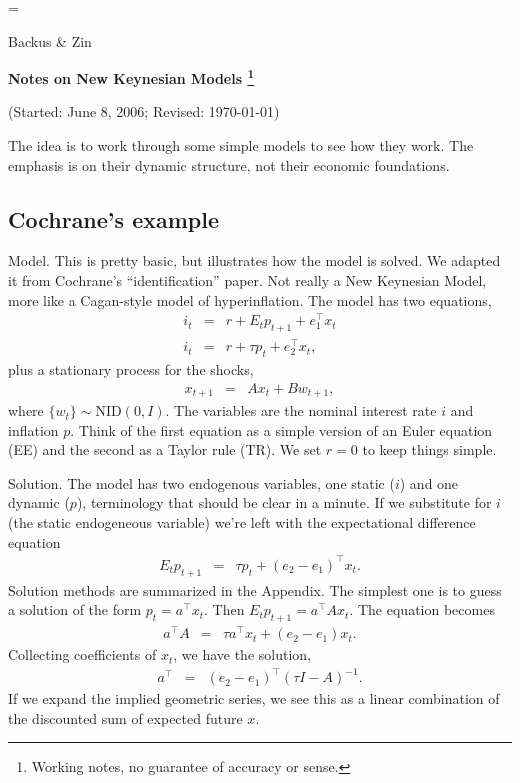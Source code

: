 \documentclass[11pt]{article}
\begin{document}
\parskip=\bigskipamount
\parindent=0.0in
\thispagestyle{empty}
\begin{flushright} Backus \& Zin \end{flushright}

\bigskip
\centerline{\Large \bf Notes on New Keynesian Models%
\footnote{Working notes, no guarantee of accuracy or sense.}}
\centerline{(Started: June 8, 2006; Revised: \today)}

\bigskip
The idea is to work through some simple models to 
see how they work.  
The emphasis is on their dynamic structure, 
not their economic foundations.   

\subsection*{Cochrane's example} 

Model.  
This is pretty basic, but illustrates how the model is solved.  
We adapted it from Cochrane's ``identification'' paper.  
Not really a New Keynesian Model, 
more like a Cagan-style model of hyperinflation.
The model has two equations, 
\begin{eqnarray*}
    i_t &=& r + E_t p_{t+1} + e_1^\top x_{t} \\
    i_t &=& r + \tau p_t + e_2^\top x_t ,
\end{eqnarray*}
plus a stationary process for the shocks, 
\begin{eqnarray*}
    x_{t+1} &=& A x_t + B w_{t+1} ,
\end{eqnarray*} 
where $\{ w_t \} \sim \mbox{NID}(0,I)$.
The variables are the nominal interest rate $i$ and inflation $p$.
Think of the first equation as a simple version of an Euler equation (EE) 
and the second as a Taylor rule (TR).
We set $r=0$ to keep things simple.    

Solution.  
The model has two endogenous variables, one static ($i$)
and one dynamic ($p$), terminology that should be clear in a minute.
If we substitute for $i$ (the static endogeneous variable)  
we're left with the expectational difference equation
\begin{eqnarray*}
    E_t p_{t+1} &=& \tau p_t  + (e_2 - e_1)^\top x_{t} .
\end{eqnarray*}
Solution methods are summarized in the Appendix.  
The simplest one is to guess a solution of the form 
$ p_t = a^\top x_t$.
Then $E_t p_{t+1} = a^\top A x_t $.
The equation becomes 
\begin{eqnarray*}
    a^\top A &=& \tau a^\top x_t + (e_2 - e_1) x_t .
\end{eqnarray*}
Collecting coefficients of $x_t$, we have the solution, 
\begin{eqnarray*}
        a^\top &=& (e_2-e_1)^\top (\tau I- A)^{-1} .
\end{eqnarray*}
If we expand the implied geometric series, 
we see this as a linear combination of 
the discounted sum of expected future $x$.
\end{document}
